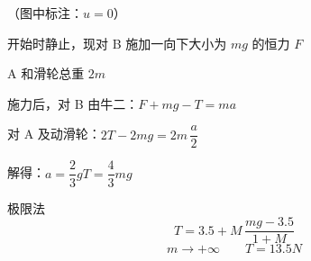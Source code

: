 \begin{problem}
（图中标注：$u=0$） %

开始时静止，现对 B 施加一向下大小为 $mg$ 的恒力 $F$

A 和滑轮总重 $2m$
\begin{solution}
施力后，对 B 由牛二：$F+mg-T=ma$

对 A 及动滑轮：$2T-2mg=2m\,\dfrac{a}{2}$

解得：$a=\dfrac23g$\qquad $T=\dfrac43mg$
\end{solution}
\end{problem}


极限法
\[
T=3.5+M\,\frac{mg-3.5}{1+M}
\]%
\[
m\to+\infty\qquad T=13.5\unit{N}
\]

